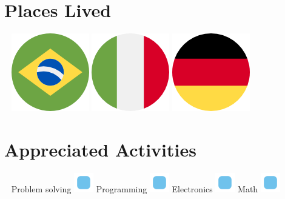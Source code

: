 \documentclass[]{friggeri-cv}
\begin{document}
\begin{aside}
	\section{Places Lived}
		~
		\includegraphics[scale=0.03]{img/brazil.png}    \includegraphics[scale=0.03]{img/italy.png}   \includegraphics[scale=0.03]{img/germany.png}
    	~
    \section{Appreciated Activities}
    	~
	    Problem solving \includegraphics[scale=0.40]{img/point.png}
	    Programming \includegraphics[scale=0.40]{img/point.png}
	    Electronics \includegraphics[scale=0.40]{img/point.png}
	    Math \includegraphics[scale=0.40]{img/point.png}
	    ~
\end{aside}
~
\end{document}
